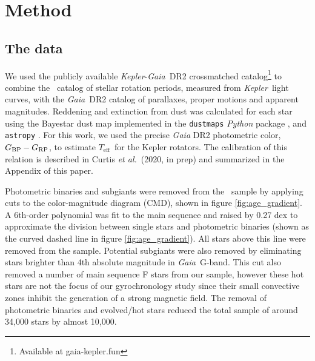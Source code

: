 \documentclass{aastex63}
\newcommand{\etal}{{\it et al.}}
\newcommand{\kepler}{{\it Kepler}}
\newcommand{\gaia}{{\it Gaia}}
\newcommand{\teff}{$T_{\mathrm{eff}}$}
\newcommand{\mct}{\citet{mcquillan2014}}
\newcommand{\racomment}[1]{{\color{black}#1}}
\begin{document}
\section{Method}
\label{sec:method}

\subsection{The data}
\label{sec:the_data}

We used the publicly available \kepler-\gaia\ DR2 crossmatched
catalog\footnote{Available at gaia-kepler.fun} to combine the \mct\ catalog of
stellar rotation periods, measured from \kepler\ light curves, with the \gaia\
DR2 catalog of parallaxes, proper motions and apparent magnitudes.
Reddening and extinction from dust was calculated for each star using the
Bayestar dust map implemented in the {\tt dustmaps} {\it Python} package
\citep{green2018}, and {\tt astropy} \citep{astropy2013, astropy2018}.
For this work, we used the precise \textit{Gaia} DR2 photometric color,
$G_{\rm BP} - G_{\rm RP}$, to estimate \teff\ for the Kepler rotators.
\racomment{The calibration of this relation is described in Curtis \etal\
(2020, in prep) and summarized in the Appendix of this paper.}

Photometric binaries and subgiants were removed from the \mct\ sample by
applying cuts to the color-magnitude diagram (CMD), shown in figure
\ref{fig:age_gradient}.
A 6th-order polynomial was fit to the main sequence and raised by 0.27 dex to
approximate the division between single stars and photometric binaries (shown
as the curved dashed line in figure \ref{fig:age_gradient}).
All stars above this line were removed from the sample.
Potential subgiants were also removed by eliminating stars brighter than 4th
absolute magnitude in \gaia\ G-band.
This cut also removed a number of main sequence F stars from our sample,
however these hot stars are not the focus of our gyrochronology study since
their small convective zones inhibit the generation of a strong magnetic
field.
The removal of photometric binaries and evolved/hot stars reduced the total
sample of around 34,000 stars by almost 10,000.
\end{document}
